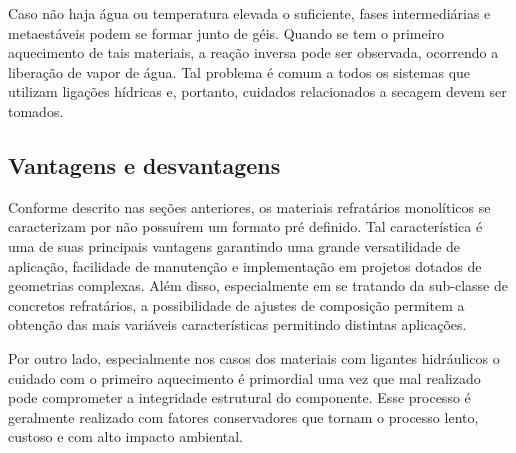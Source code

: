
	Caso não haja água ou temperatura elevada o suficiente, fases intermediárias e
  metaestáveis podem se formar junto de géis. Quando se tem o primeiro
  aquecimento de tais materiais, a reação inversa pode ser observada, ocorrendo
  a liberação de vapor de água. Tal problema é comum a todos os sistemas que utilizam ligações hídricas e, portanto, cuidados relacionados a secagem devem ser tomados.

    \subsection{Vantagens e desvantagens}
      Conforme descrito nas seções anteriores, os materiais refratários
      monolíticos se caracterizam por não possuírem um formato pré definido. Tal
      característica é uma de suas principais vantagens garantindo uma grande
      versatilidade de aplicação, facilidade de manutenção e implementação em
      projetos dotados de geometrias complexas. Além disso, especialmente em se
      tratando da sub-classe de concretos refratários, a possibilidade de
      ajustes de composição permitem a obtenção das mais variáveis
      características permitindo distintas aplicações.

      Por outro lado, especialmente nos casos dos materiais com ligantes
      hidráulicos o cuidado com o primeiro aquecimento é primordial uma vez que
      mal realizado pode comprometer a integridade estrutural do componente.
      Esse processo é geralmente realizado com fatores conservadores que tornam
      o processo lento, custoso e com alto impacto ambiental.

 
